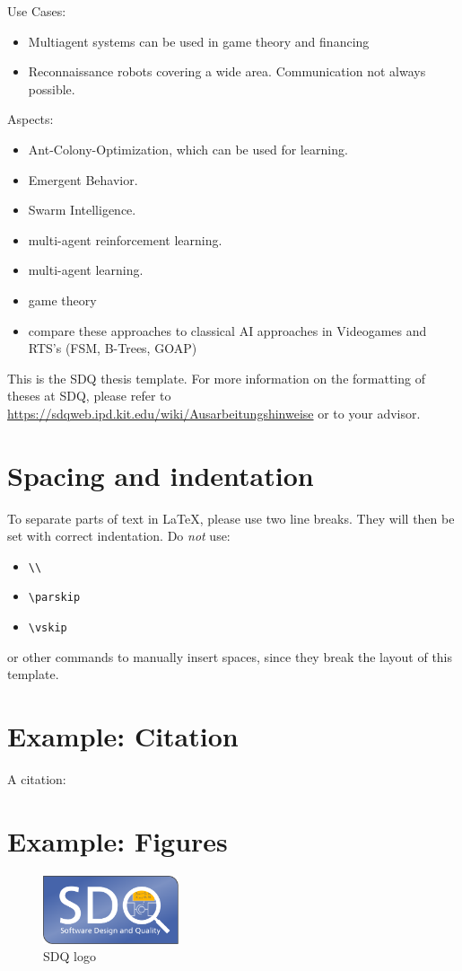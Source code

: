 Use Cases:
\begin{itemize}[noitemsep,nolistsep]
	\item Multiagent systems can be used in game theory and financing
	\item Reconnaissance robots covering a wide area. Communication not always possible.
\end{itemize}
Aspects:
\begin{itemize}[noitemsep,nolistsep]
	\item Ant-Colony-Optimization, which can be used for learning.
	\item Emergent Behavior.
	\item Swarm Intelligence.
	\item multi-agent reinforcement learning.
	\item multi-agent learning.
	\item game theory
	\item compare these approaches to classical AI approaches in Videogames and RTS's (FSM, B-Trees, GOAP)
\end{itemize}



This is the SDQ thesis template.
For more information on the formatting of theses at SDQ, please refer to
\url{https://sdqweb.ipd.kit.edu/wiki/Ausarbeitungshinweise} or to your advisor.

\section{Spacing and indentation}
To separate parts of text in \LaTeX, please use two line breaks.
They will then be set with correct indentation.
Do \emph{not} use:
\begin{itemize}
  \itemsep0em
  \item \texttt{\textbackslash\textbackslash}
  \item \texttt{\textbackslash parskip}
  \item \texttt{\textbackslash vskip}
\end{itemize} 
or other commands to manually insert spaces, since they break the layout of this template.

\section{Example: Citation}
A citation: \cite{becker2008a} 

\section{Example: Figures}
\label{sec:Introduction:Figures}
\begin{figure}
\centering
\includegraphics[width=4cm]{logos/sdqlogo}
\caption{SDQ logo}
\label{fig:sdqlogo}
\end{figure}

